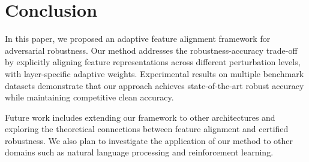 \section{Conclusion}
\label{sec:conclusion}

In this paper, we proposed an adaptive feature alignment framework for adversarial robustness. Our method addresses the robustness-accuracy trade-off by explicitly aligning feature representations across different perturbation levels, with layer-specific adaptive weights. Experimental results on multiple benchmark datasets demonstrate that our approach achieves state-of-the-art robust accuracy while maintaining competitive clean accuracy.

Future work includes extending our framework to other architectures and exploring the theoretical connections between feature alignment and certified robustness. We also plan to investigate the application of our method to other domains such as natural language processing and reinforcement learning.